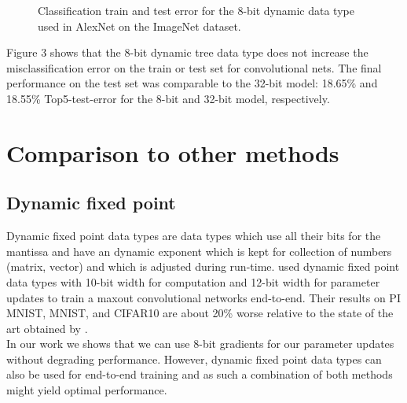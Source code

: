 \documentclass{article} %
\begin{document}
\begin{figure}[h]
	\begin{center}
	\end{center}
	\caption{Classification train and test error for the 8-bit dynamic data type used in AlexNet on the ImageNet dataset.}
\end{figure}

Figure 3 shows that the 8-bit dynamic tree data type does not increase the misclassification error on the train or test set for convolutional nets. The final performance on the test set was comparable to the 32-bit model: 18.65\% and 18.55\% Top5-test-error for the 8-bit and 32-bit model, respectively.

\section{Comparison to other methods}

\subsection{Dynamic fixed point}

Dynamic fixed point data types are data types which use all their bits for the mantissa and have an dynamic exponent which is kept for collection of numbers (matrix, vector) and which is adjusted during run-time. \citet{courbariaux2014low} used dynamic fixed point data types with 10-bit width for computation and 12-bit width for parameter updates to train a maxout convolutional networks end-to-end. Their results on PI MNIST, MNIST, and CIFAR10 are about 20\% worse relative to the state of the art obtained by \citet{goodfellow2013maxout}.\\ 
In our work we shows that we can use 8-bit gradients for our parameter updates without degrading performance. However, dynamic fixed point data types can also be used for end-to-end training and as such a combination of both methods might yield optimal performance. 
\end{document}
